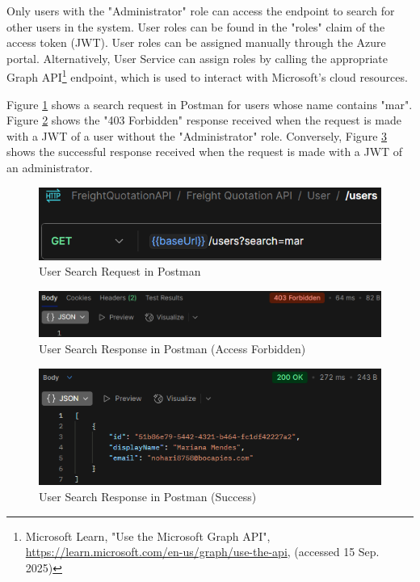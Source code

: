 \documentclass[12pt,reqno, oneside]{amsbook}
\theoremstyle{definition}
\theoremstyle{definition}
\numberwithin{section}{chapter}
\numberwithin{table}{chapter}
\numberwithin{figure}{chapter}
\begin{document}
Only users with the "Administrator" role can access the endpoint to search for other users in the system. User roles can be found in the "roles" claim of the access token (\ac{JWT}). User roles can be assigned manually through the Azure portal. Alternatively, User Service can assign roles by calling the appropriate Graph \ac{API}\footnote{Microsoft Learn, "Use the Microsoft Graph API", \url{https://learn.microsoft.com/en-us/graph/use-the-api}, (accessed 15 Sep. 2025)} endpoint, which is used to interact with Microsoft's cloud resources.

Figure \ref{Figure:UserSearchRequestPostman} shows a search request in Postman for users whose name contains "mar". Figure \ref{UserSearchResponsePostmanForbidden} shows the "403 Forbidden" response received when the request is made with a \ac{JWT} of a user without the "Administrator" role. Conversely, Figure \ref{UserSearchResponsePostmanSuccess} shows the successful response received when the request is made with a \ac{JWT} of an administrator.

\begin{figure}[H]
  \centering
  \includegraphics[width=0.9\linewidth]{images/UserSearchRequestPostman.png}
  \caption{\label{Figure:UserSearchRequestPostman}User Search Request in Postman}
\end{figure}

\begin{figure}[H]
  \centering
  \includegraphics[width=0.9\linewidth]{images/UserSearchResponsePostmanForbidden.png}
  \caption{\label{UserSearchResponsePostmanForbidden}User Search Response in Postman (Access Forbidden)}
\end{figure}

\begin{figure}[H]
  \centering
  \includegraphics[width=0.9\linewidth]{images/UserSearchResponsePostmanSuccess.png}
  \caption{\label{UserSearchResponsePostmanSuccess}User Search Response in Postman (Success)}
\end{figure}
\end{document}
